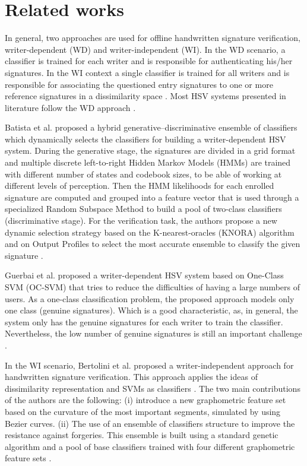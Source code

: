 \documentclass[conference]{IEEEtran}
\begin{document}
\section{Related works}
\label{sec:related_works}

In general, two approaches are used for offline handwritten signature verification, writer-dependent (WD) and writer-independent (WI). In the WD scenario, a classifier is trained for each writer and is responsible for authenticating his/her signatures. In the WI context a single classifier is trained for all writers and is responsible for associating the questioned entry signatures to one or more reference signatures in a dissimilarity space \cite{hafemann:17}. Most HSV systems presented in literature follow the WD approach \cite{hafemann_review:17}.

Batista et al. \cite{batista:12} proposed a hybrid generative–discriminative ensemble of classifiers which dynamically selects the classifiers for building a writer-dependent HSV system. During the generative stage, the signatures are divided in a grid format and multiple discrete left-to-right Hidden Markov Models (HMMs) are trained with different number of states and codebook sizes, to be able of working at different levels of perception. Then the HMM likelihoods for each enrolled signature are computed and grouped into a feature vector that is used through a specialized Random Subspace Method to build a pool of two-class classifiers (discriminative stage). For the verification task, the authors propose a new dynamic selection strategy based on the K-nearest-oracles (KNORA) algorithm and on Output Profiles to select the most accurate ensemble to classify the given signature \cite{batista:12}.

Guerbai et al. \cite{guerbai:15} proposed a writer-dependent HSV system based on One-Class SVM (OC-SVM) that tries to reduce the difficulties of having a large numbers of users. As a one-class classification problem, the proposed approach models only one class (genuine signatures). Which is a good characteristic, as, in general, the system only has the genuine signatures for each writer to train the classifier. Nevertheless, the low number of genuine signatures is still an important challenge \cite{guerbai:15}.

In the WI scenario, Bertolini et al. \cite{bertolini:10} proposed a  writer-independent approach for handwritten signature verification. This approach applies the ideas of dissimilarity representation and SVMs as classifiers \cite{bertolini:10}. The two main contributions of the authors are the following: (i) introduce a new graphometric feature set based on the curvature of the most important segments, simulated by using Bezier curves. (ii) The use of an ensemble of classifiers structure to improve the resistance against forgeries. This ensemble is built using a standard genetic algorithm and a pool of base classifiers trained with four different graphometric feature sets \cite{bertolini:10}.
\end{document}
